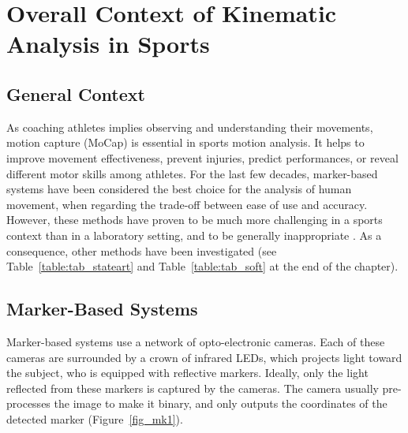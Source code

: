 \minitoc
\newpage



\FloatBarrier
\section{Overall Context of Kinematic Analysis in Sports}
\subsection{General Context}

As coaching athletes implies observing and understanding their movements, motion capture (MoCap) is essential in sports motion analysis. It helps to improve movement effectiveness, prevent injuries, predict performances, or reveal different motor skills among athletes. For the last few decades, marker-based systems have been considered the best choice for the analysis of human movement, when regarding the trade-off between ease of use and accuracy. However, these methods have proven to be much more challenging in a sports context than in a laboratory setting, and to be generally inappropriate \cite{Mündermann2006, Colyer2018}. As a consequence, other methods have been investigated (see Table~\ref{table:tab_stateart} and Table~\ref{table:tab_soft} at the end of the chapter).

\subsection{Marker-Based Systems}

Marker-based systems use a network of opto-electronic cameras. Each of these cameras are surrounded by a crown of infrared LEDs, which projects light toward the subject, who is equipped with reflective markers. Ideally, only the light reflected from these markers is captured by the cameras. The camera usually pre-processes the image to make it binary, and only outputs the coordinates of the detected marker (Figure~\ref{fig_mk1}). 

